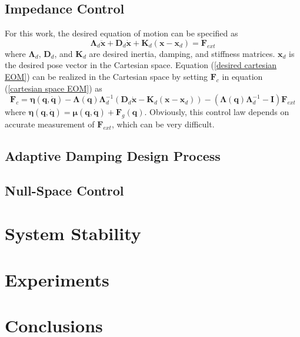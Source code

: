 \documentclass{article}
\newcommand{\q}{\bm{q}}
\newcommand{\qdot}{\dot{\bm{q}}}
\newcommand{\F}{\bm{F}}
\newcommand{\LambdaBold}{\bm{\Lambda}}
\newcommand{\x}{\bm{x}}
\newcommand{\xdot}{\dot{\bm{x}}}
\newcommand{\xdotdot}{\ddot{\bm{x}}}
\newcommand{\muBold}{\bm{\mu}}
\newcommand{\Dd}{\bm{D}_d}
\newcommand{\Kd}{\bm{K}_d}
\newcommand{\I}{\bm{I}}
\newcommand{\etaBold}{\bm{\eta}}
\begin{document}
\subsection{Impedance Control}
For this work, the desired equation of motion can be specified as
%
\begin{equation}
    \LambdaBold_d\xdotdot+\Dd\xdot+\Kd(\x-\x_d)=\F_{ext}
    \label{desired cartesian EOM}
\end{equation}
%
%
where $\LambdaBold_d$, $\Dd$, and $\Kd$ are desired inertia, damping, and stiffness matrices. $\x_d$ is the desired pose vector in the Cartesian space. Equation (\ref{desired cartesian EOM}) can be realized in the Cartesian space by setting $\F_c$ in equation (\ref{cartesian space EOM}) as
\begin{equation}
    \F_c=\etaBold(\q,\qdot)-\LambdaBold(\q)\LambdaBold^{-1}_d(\Dd\xdot-\Kd(\x-\x_d))-(\LambdaBold(\q)\LambdaBold^{-1}_d-\I)\F_{ext}
    \label{classic control law}
\end{equation}
where $\etaBold(\q,\qdot)=\muBold(\q,\qdot)+\F_g(\q)$. Obviously, this control law depends on accurate measurement of $\F_{ext}$, which can be very difficult.
\subsection{Adaptive Damping Design Process}
\subsection{Null-Space Control}


\section{System Stability}

\section{Experiments}

\section{Conclusions}
\end{document}
